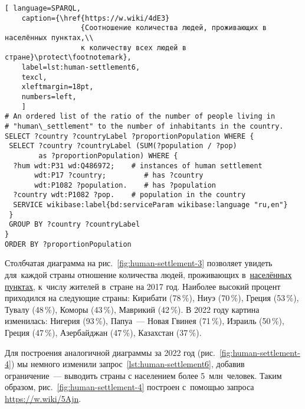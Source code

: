 \begin{lstlisting}[ language=SPARQL, 
    caption={\href{https://w.wiki/4dE3}
                  {Соотношение количества людей, проживающих в населённых пунктах,\\
                  к количеству всех людей в стране}\protect\footnotemark},
    label=lst:human-settlement6,
    texcl,
    xleftmargin=18pt, 
    numbers=left,
    ]
# An ordered list of the ratio of the number of people living in 
# "human\_settlement" to the number of inhabitants in the country.
SELECT ?country ?countryLabel ?proportionPopulation WHERE {
 SELECT ?country ?countryLabel (SUM(?population / ?pop) 
        as ?proportionPopulation) WHERE {
  ?hum wdt:P31 wd:Q486972;    # instances of human settlement  
       wdt:P17 ?country;         # has ?country 
       wdt:P1082 ?population.    # has ?population
  ?country wdt:P1082 ?pop.    # population in the country
  SERVICE wikibase:label{bd:serviceParam wikibase:language "ru,en"}
 }
 GROUP BY ?country ?countryLabel
}
ORDER BY ?proportionPopulation
\end{lstlisting}%


Столбчатая диаграмма на рис.~\ref{fig:human-settlement-3} позволяет увидеть для~каждой страны 
отношение количества людей, 
проживающих в~\href{http://www.wikidata.org/entity/Q486972}{населённых пунктах}, 
к~числу жителей в~стране на 2017 год.
Наиболее высокий процент приходился на следующие страны: 
Кирибати (78\,\%), Ниуэ (70\,\%), Греция (53\,\%), Тувалу (48\,\%), Коморы (43\,\%), Маврикий (42\,\%). 
В 2022 году картина изменилась: Нигерия (93\,\%), Папуа~--- Новая Гвинея (71\,\%), 
Израиль (50\,\%), Греция (47\,\%), Азербайджан (47\,\%), Казахстан (37\,\%). 


Для построения аналогичной диаграммы за 2022 год (рис.~\ref{fig:human-settlement-4}) 
мы немного изменили запрос~\ref{lst:human-settlement6}, 
добавив ограничение~--- выводить страны с населением более 5~млн~человек. Таким образом, рис.~\ref{fig:human-settlement-4} построен 
с~помощью запроса \href{https://w.wiki/5Ajn}{https://w.wiki/5Ajn}. 


